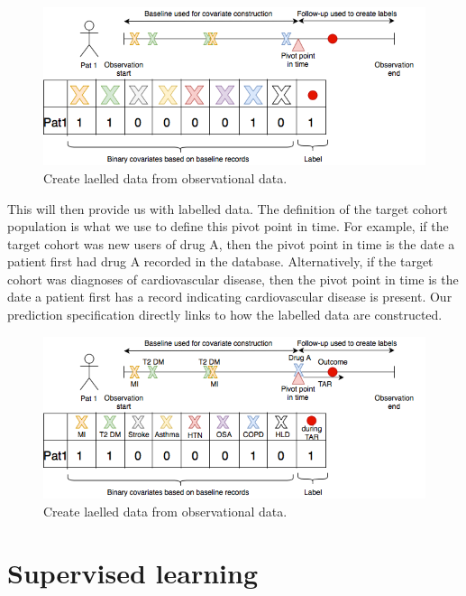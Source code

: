 \documentclass[11pt]{book}
\begin{document}
\begin{figure}
\includegraphics[width=1\linewidth]{images/PatientLevelPrediction/theory/dataplot1} \caption{Create laelled data from observational data.}\label{fig:figuretheory2}
\end{figure}

This will then provide us with labelled data. The definition of the
target cohort population is what we use to define this pivot point in
time. For example, if the target cohort was new users of drug A, then
the pivot point in time is the date a patient first had drug A recorded
in the database. Alternatively, if the target cohort was diagnoses of
cardiovascular disease, then the pivot point in time is the date a
patient first has a record indicating cardiovascular disease is present.
Our prediction specification directly links to how the labelled data are
constructed.

\begin{figure}
\includegraphics[width=1\linewidth]{images/PatientLevelPrediction/theory/dataplot2} \caption{Create laelled data from observational data.}\label{fig:figuretheory3}
\end{figure}

\hypertarget{supervised}{\section{Supervised
learning}\label{supervised}}
\end{document}

